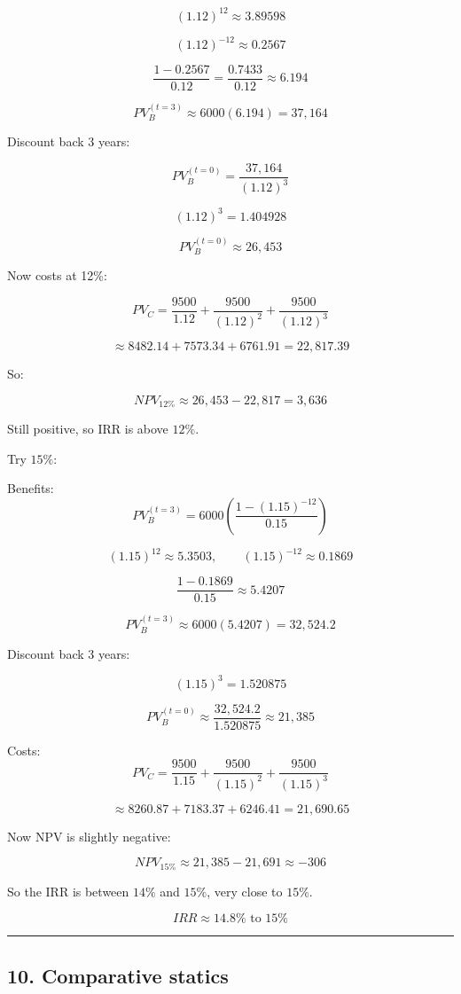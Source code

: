 \documentclass[12pt]{article}
\begin{document}
\[
(1.12)^{12} \approx 3.89598
\]

\[
(1.12)^{-12} \approx 0.2567
\]

\[
\frac{1-0.2567}{0.12} = \frac{0.7433}{0.12} \approx 6.194
\]

\[
PV_B^{(t=3)} \approx 6000(6.194)=37{,}164
\]

Discount back 3 years:

\[
PV_B^{(t=0)} = \frac{37{,}164}{(1.12)^3}
\]

\[
(1.12)^3 = 1.404928
\]

\[
PV_B^{(t=0)} \approx 26{,}453
\]

Now costs at 12\%:

\[
PV_C = \frac{9500}{1.12} + \frac{9500}{(1.12)^2} + \frac{9500}{(1.12)^3}
\]

\[
\approx 8482.14 + 7573.34 + 6761.91 = 22{,}817.39
\]

So:

\[
NPV_{12\%} \approx 26{,}453 - 22{,}817 = 3{,}636
\]

Still positive, so IRR is above \(12\%\).

Try \(15\%\):

Benefits:
\[
PV_B^{(t=3)} = 6000\left(\frac{1-(1.15)^{-12}}{0.15}\right)
\]

\[
(1.15)^{12}\approx 5.3503,\qquad (1.15)^{-12}\approx 0.1869
\]

\[
\frac{1-0.1869}{0.15} \approx 5.4207
\]

\[
PV_B^{(t=3)} \approx 6000(5.4207)=32{,}524.2
\]

Discount back 3 years:

\[
(1.15)^3=1.520875
\]

\[
PV_B^{(t=0)}\approx \frac{32{,}524.2}{1.520875}\approx 21{,}385
\]

Costs:
\[
PV_C=\frac{9500}{1.15}+\frac{9500}{(1.15)^2}+\frac{9500}{(1.15)^3}
\]

\[
\approx 8260.87+7183.37+6246.41=21{,}690.65
\]

Now NPV is slightly negative:

\[
NPV_{15\%}\approx 21{,}385-21{,}691\approx -306
\]

So the IRR is between \(14\%\) and \(15\%\), very close to \(15\%\).

\[
\boxed{IRR \approx 14.8\% \text{ to } 15\%}
\]

\hrule
\vspace{0.5em}

\subsection*{10. Comparative statics}
\end{document}
